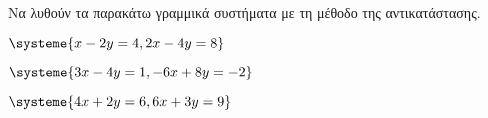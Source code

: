 Να λυθούν τα παρακάτω γραμμικά συστήματα με τη μέθοδο της αντικατάστασης.
\begin{multicols}{2}
\begin{rlist}[leftmargin=5mm]
\item $ \systeme{x-2y=4,2x-4y=8} $
\item $ \systeme{3x-4y=1,-6x+8y=-2} $
\item $ \systeme{4x+2y=6,6x+3y=9} $
\end{rlist}
\end{multicols}
